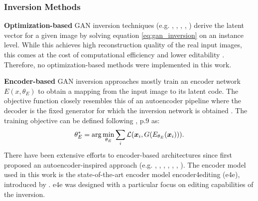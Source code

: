 \subsubsection{Inversion Methods}
\textbf{Optimization-based} GAN inversion techniques (e.g. \cite{yeh2017semantic}, \cite{creswell2018inverting}, \cite{gu2020image}, \cite{bau2020semantic}, \cite{lipton2017precise}) derive the latent vector for a given image by solving equation \ref{eq:gan_inversion} on an instance level. While this achieves high reconstruction quality of the real input images, this comes at the cost of computational efficiency \citep[p.2]{alaluf2021restyle} and lower editability \citep[p.3]{tov2021designing}. Therefore, no optimization-based methods were implemented in this work.

\textbf{Encoder-based} GAN inversion approaches mostly train an encoder network $E(x, \theta_E)$ to obtain a mapping from the input image to its latent code. The objective function closely resembles this of an autoencoder pipeline where the decoder is the fixed generator for which the inversion network is obtained \citep[p.6]{xia2022gan}. The training objective can be defined following \cite{bermano2022state}, p.9 as: 
\begin{equation}
    \theta^*_E = \arg \min_{\theta_E} \sum_i \mathcal{L}(\boldsymbol x_i, G(E_{\theta_E}(\boldsymbol x_i))).
\end{equation}
There have been extensive efforts to encoder-based architectures since \cite{luo2017learning} first proposed an autoencoder-inspired approach (e.g. \cite{kim2021exploiting}, \cite{wang2022high}, \cite{shanyan2020collaborative}, \cite{pidhorskyi2020adversarial}, \cite{kang2021gan}, \cite{richardson2021encoding}, \cite{he2016deep}). The encoder model used in this work is the state-of-the-art encoder model encoder4editing (e4e), introduced by \cite{tov2021designing}. e4e was designed with a particular focus on editing capabilities of the inversion.

